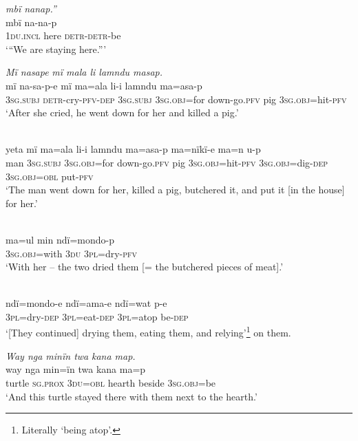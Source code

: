 \ex {} \textit{mbï nanap.”}\\
 mbï  na{{}-}na{{}-}p\\
1\textsc{du.incl}  here  \textsc{detr-detr-}be\\
\glt ‘“{We are staying here.”}’

\ex \negmedspace \textit{Mï nasap}{\textit{e}} \textit{mï mala li lamndu masap.}\\
\gll mï      na{{}-}sa{{}-}p{{}-e} mï       ma=ala    li-i {l}amndu  ma=asa-p\\
3\textsc{sg.subj}  \textsc{detr-}cry-\textsc{pfv-dep}  3\textsc{sg.subj}  3\textsc{sg.obj=}for  down-go.\textsc{pfv} pig      3\textsc{sg.obj}=hit-\textsc{pfv}\\
\glt ‘After she cried, he went down for her and killed a pig.’

\newpage

\ex {}\\
\gll yeta  mï      ma=ala    li-i lamndu  ma=as{a-}p ma{=}nïkï{{}-}e      ma{=}n      u-p\\
man  3\textsc{sg.subj}  3\textsc{sg.obj}=for  down-go.\textsc{pfv}  pig      3\textsc{sg.obj}=hit-\textsc{pfv} 3\textsc{sg.obj}=dig{}-\textsc{dep}  3\textsc{sg.obj=obl}  put-\textsc{pfv}\\
\glt ‘The man went down for her, killed a pig, butchered it, and put {it [}in the house] for her.’

\ex {}\\
\gll m{a=u}l      min  ndï{=}mondo-p\\
3\textsc{sg.obj}=with  3\textsc{du}  3\textsc{pl}=dry-\textsc{pfv}\\
\glt ‘With her -- the two dried them [= the butchered pieces of meat].’

\ex {}\\
\gll ndï{=}mondo-e    ndï={a}ma-e    ndï{=}wat  p{{}-}e\\
3\textsc{pl}=dry-\textsc{dep}    \textsc{3pl}=eat-\textsc{dep}  \textsc{3pl}=atop  be-\textsc{dep}\\
\glt ‘[They continued] drying them, eating them, and {relying}’\footnote{Literally ‘being atop’.} on them.

\ex \negmedspace \textit{Way nga min}{\textit{ï}}\textit{n t}{\textit{wa}} \textit{k}{\textit{a}}\textit{na map.}\\
\gll way  nga      min{=}{ï}{n} t{wa} k{a}na  {m}a{=}p\\
turtle  \textsc{sg.prox}  3\textsc{du=obl}  hearth  beside  3\textsc{sg.obj}=be\\
\glt ‘And this turtle stayed {there} with them next to the hearth.’

